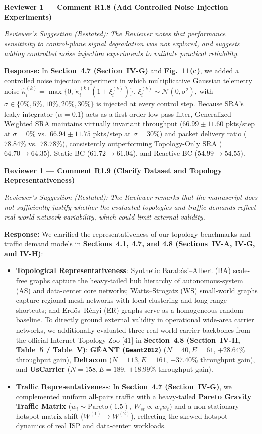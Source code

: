\documentclass[11pt,a4paper]{article}
\newcommand{\cbox}[2]{%
  \vspace{0.6em}\noindent\textbf{#1}\par\smallskip
  \noindent\textit{Reviewer's Suggestion (Restated):} \textit{#2}\par\smallskip
}
\begin{document}
\hrulefill

\cbox{Reviewer 1 --- Comment R1.8 (Add Controlled Noise Injection Experiments)}{The Reviewer notes that performance sensitivity to control-plane signal degradation was not explored, and suggests adding controlled noise injection experiments to validate practical reliability.}

\noindent\textbf{Response:} In \textbf{Section~4.7 (Section~IV-G)} and \textbf{Fig.~11(c)}, we added a controlled noise injection experiment in which multiplicative Gaussian telemetry noise $\widehat{\kappa}_i^{(k)} = \max\{0,\, \widetilde{\kappa}_i^{(k)}(1 + \xi_i^{(k)})\}$, $\xi_i^{(k)} \sim \mathcal{N}(0, \sigma^2)$, with $\sigma \in \{0\%, 5\%, 10\%, 20\%, 30\%\}$ is injected at every control step. Because SRA's leaky integrator ($\alpha=0.1$) acts as a first-order low-pass filter, Generalized Weighted SRA maintains virtually invariant throughput ($66.99 \pm 11.60$ pkts/step at $\sigma=0\%$ vs.\ $66.94 \pm 11.75$ pkts/step at $\sigma=30\%$) and packet delivery ratio ($78.84\%$ vs.\ $78.78\%$), consistently outperforming Topology-Only SRA ($64.70 \to 64.35$), Static BC ($61.72 \to 61.04$), and Reactive BC ($54.99 \to 54.55$).

\hrulefill

\cbox{Reviewer 1 --- Comment R1.9 (Clarify Dataset and Topology Representativeness)}{The Reviewer remarks that the manuscript does not sufficiently justify whether the evaluated topologies and traffic demands reflect real-world network variability, which could limit external validity.}

\noindent\textbf{Response:} We clarified the representativeness of our topology benchmarks and traffic demand models in \textbf{Sections~4.1, 4.7, and 4.8 (Sections~IV-A, IV-G, and IV-H)}:
\begin{itemize}[leftmargin=1.8em]
    \item \textbf{Topological Representativeness}: Synthetic Barab\'{a}si--Albert (BA) scale-free graphs capture the heavy-tailed hub hierarchy of autonomous-system (AS) and data-center core networks; Watts--Strogatz (WS) small-world graphs capture regional mesh networks with local clustering and long-range shortcuts; and Erd\H{o}s--R\'{e}nyi (ER) graphs serve as a homogeneous random baseline. To directly ground external validity in operational wide-area carrier networks, we additionally evaluated three real-world carrier backbones from the official Internet Topology Zoo [41] in \textbf{Section~4.8 (Section~IV-H, Table~5 / Table~V)}: \textbf{G\'EANT (\texttt{Geant2012})} ($N=40, E=61$, $+28.64\%$ throughput gain), \textbf{Deltacom} ($N=113, E=161$, $+37.40\%$ throughput gain), and \textbf{UsCarrier} ($N=158, E=189$, $+18.99\%$ throughput gain).
    \item \textbf{Traffic Representativeness}: In \textbf{Section~4.7 (Section~IV-G)}, we complemented uniform all-pairs traffic with a heavy-tailed \textbf{Pareto Gravity Traffic Matrix} ($w_i \sim \mathrm{Pareto}(1.5)$, $W_{st} \propto w_s w_t$) and a non-stationary hotspot matrix shift ($W^{(1)} \to W^{(2)}$), reflecting the skewed hotspot dynamics of real ISP and data-center workloads.
\end{itemize}
\end{document}
